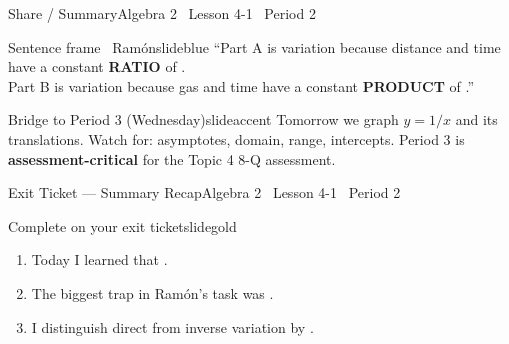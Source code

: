 \documentclass[aspectratio=169, 11pt]{beamer}
\begin{document}
\begin{frame}{Share / Summary}{Algebra 2 \textperiodcentered\ Lesson 4-1 \textperiodcentered\ Period 2}
\vspace{0.2cm}
\begin{projcard}{Sentence frame \textperiodcentered\ Ramón}{slideblue}
``Part A is \underline{\hspace{1cm}} variation because distance and time
have a constant \textbf{RATIO} of \underline{\hspace{1cm}}.\\
Part B is \underline{\hspace{1cm}} variation because gas and time have
a constant \textbf{PRODUCT} of \underline{\hspace{1cm}}.''
\end{projcard}

\vspace{0.15cm}
\begin{projcard}{Bridge to Period 3 (Wednesday)}{slideaccent}
Tomorrow we graph \(y = 1/x\) and its translations.
Watch for: asymptotes, domain, range, intercepts.
Period 3 is \textbf{assessment-critical} for the Topic 4 8-Q assessment.
\end{projcard}
\end{frame}

\begin{frame}{Exit Ticket --- Summary Recap}{Algebra 2 \textperiodcentered\ Lesson 4-1 \textperiodcentered\ Period 2}
\vspace{0.2cm}
\begin{projcard}{Complete on your exit ticket}{slidegold}
\begin{enumerate}
  \setlength{\itemsep}{0.2cm}
  \item Today I learned that \underline{\hspace{5cm}}.
  \item The biggest trap in Ramón's task was \underline{\hspace{5cm}}.
  \item I distinguish direct from inverse variation by \underline{\hspace{5cm}}.
\end{enumerate}
\end{projcard}
\end{frame}
\end{document}
